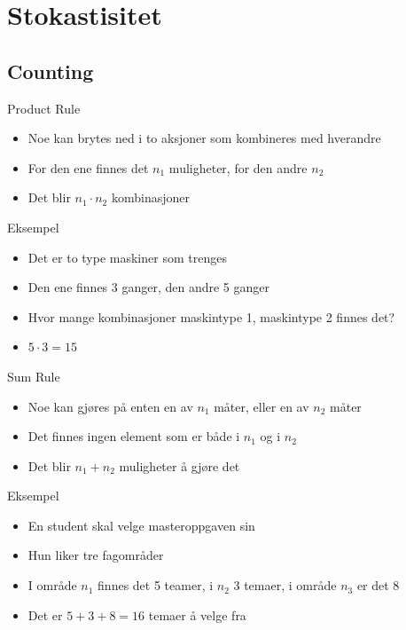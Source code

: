 \section{Stokastisitet}
\subsection{Counting}
\begin{frame}
\begin{block}{Product Rule}
\begin{itemize}
\item Noe kan brytes ned i to aksjoner som kombineres med hverandre
\item For den ene finnes det $n_1$ muligheter, for den andre $n_2$
\item Det blir $n_1\cdot n_2$ kombinasjoner
\end{itemize}
\end{block}
\pause
\begin{block}{Eksempel}
\begin{itemize}
\item Det er to type maskiner som trenges
\item Den ene finnes 3 ganger, den andre 5 ganger
\item Hvor mange kombinasjoner maskintype 1, maskintype 2 finnes det?
\item $5\cdot 3=15$
\end{itemize}
\end{block}
\end{frame}

\begin{frame}
\begin{block}{Sum Rule}
\begin{itemize}
\item Noe kan gjøres på enten en av $n_1$ måter, eller en av $n_2$ måter
\item Det finnes ingen element som er både i $n_1$ og i $n_2$
\item Det blir $n_1+n_2$ muligheter å gjøre det
\end{itemize}
\end{block}
\pause
\begin{block}{Eksempel}
\begin{itemize}
\item En student skal velge masteroppgaven sin
\item Hun liker tre fagområder
\item I område $n_1$ finnes det 5 teamer, i $n_2$ 3 temaer, i område $n_3$ er det 8
\item Det er $5+3+8=16$ temaer å velge fra
\end{itemize}
\end{block}
\end{frame}

